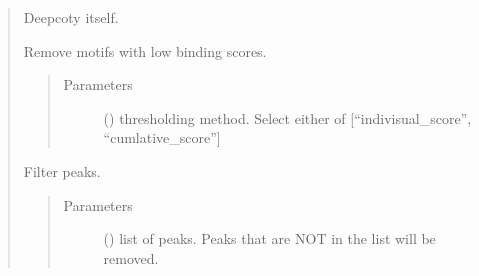 \documentclass[letterpaper,10pt,english]{sphinxmanual}
\begin{document}
\begin{quote}
\begin{fulllineitems}
\begin{fulllineitems}
\label{\detokenize{modules/celloracle.motif_analysis:celloracle.motif_analysis.TFinfo.copy}}
Deepcoty itself.

\end{fulllineitems}


\begin{fulllineitems}
\label{\detokenize{modules/celloracle.motif_analysis:celloracle.motif_analysis.TFinfo.filter_motifs_by_score}}
Remove motifs with low binding scores.
\begin{quote}\begin{description}
\item[{Parameters}] \leavevmode
{} () \textendash{} thresholding method. Select either of {[}“indivisual\_score”, “cumlative\_score”{]}

\end{description}\end{quote}

\end{fulllineitems}


\begin{fulllineitems}
\label{\detokenize{modules/celloracle.motif_analysis:celloracle.motif_analysis.TFinfo.filter_peaks}}
Filter peaks.
\begin{quote}\begin{description}
\item[{Parameters}] \leavevmode
{} () \textendash{} list of peaks. Peaks that are NOT in the list will be removed.

\end{description}\end{quote}

\end{fulllineitems}


\end{fulllineitems}
\end{quote}
\end{document}
